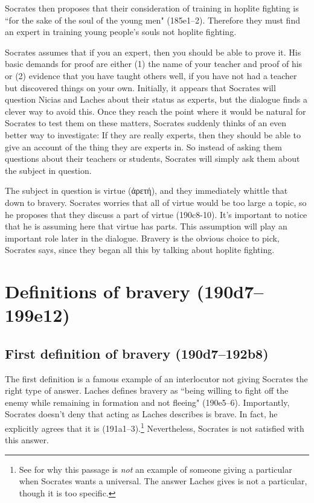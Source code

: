 \documentclass[11pt]{article}
\begin{document}
Socrates then proposes that their consideration of training in hoplite fighting
is ``for the sake of the soul of the young men" (185e1--2).  Therefore they
must find an expert in training young people's souls not hoplite fighting.

Socrates assumes that if you an expert, then you should be able to prove it.
His basic demands for proof are either (1) the name of your teacher and proof
of his  or (2) evidence that you have taught others well,
if you have not had a teacher but discovered things on your own.  Initially, it
appears that Socrates will question Nicias and Laches about their status as
experts, but the dialogue finds a clever way to avoid this.  Once they reach
the point where it would be natural for Socrates to test them on these matters,
Socrates suddenly thinks of an even better way to investigate: If they are
really experts, then they should be able to give an account of the thing they
are experts in.  So instead of asking them questions about their teachers or
students, Socrates will simply ask them about the subject in question.

The subject in question is virtue ({\g ἀρετή}), and they immediately whittle
that down to bravery.  Socrates worries that all of virtue would be too large
a topic, so he proposes that they discuss a part of virtue (190c8-10).  It's
important to notice that he is assuming here that virtue has parts.  This
assumption will play an important role later in the dialogue.  Bravery is the
obvious choice to pick, Socrates says, since they began all this by talking
about hoplite fighting.


\section{Definitions of bravery (190d7--199e12)}

\subsection{First definition of bravery (190d7--192b8)}

The first definition is a famous example of an interlocutor not giving Socrates
the right type of answer.  Laches defines bravery as ``being willing to fight
off the enemy while remaining in formation and not fleeing" (190e5--6).
Importantly, Socrates doesn't deny that acting as Laches describes is brave.
In fact, he explicitly agrees that it is (191a1--3).\footnote{See
\citet{nehamas1975} for why this passage is \emph{not} an example of someone
giving a particular when Socrates wants a universal.  The answer Laches gives
is not a particular, though it is too specific.}  Nevertheless, Socrates is not
satisfied with this answer.
\end{document}
